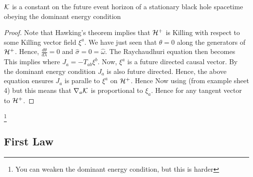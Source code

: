\documentclass{article}
\begin{document}
\begin{lemma}
\begin{theorem}
$\mathcal{K}$ is a constant on the future event horizon of a stationary black hole spacetime obeying the dominant energy condition 
\end{theorem}
\begin{proof}
Note that Hawking's theorem implies that $\mathcal{H}^+$ is Killing with respect to some Killing vector field $\xi^a$. We have just seen that $\theta=0$ along the generators of $\mathcal{H}^+$. Hence, $\frac{d\theta}{d\lambda}=0$ and $\hat{\sigma} = 0 = \hat{\omega}$. The Raychaudhuri equation then becomes 
This implies 
where $J_a = -T_{ab} \xi^b$. Now, $\xi^a$ is a future directed causal vector. By the dominant energy condition $J_a$ is also future directed. Hence, the above equation ensures $J_a$ is paralle to $\xi^a$ on $\mathcal{H}^+$. Hence 
Now using (from example sheet 4) 
but this means that $\nabla_a \mathcal{K}$ is proportional to $\xi_a$. Hence 
for any tangent vector to $\mathcal{H}^+$. 
\end{proof}\footnote{You can weaken the dominant energy condition, but this is harder}

\subsection{First Law}


\end{lemma}
\end{document}
